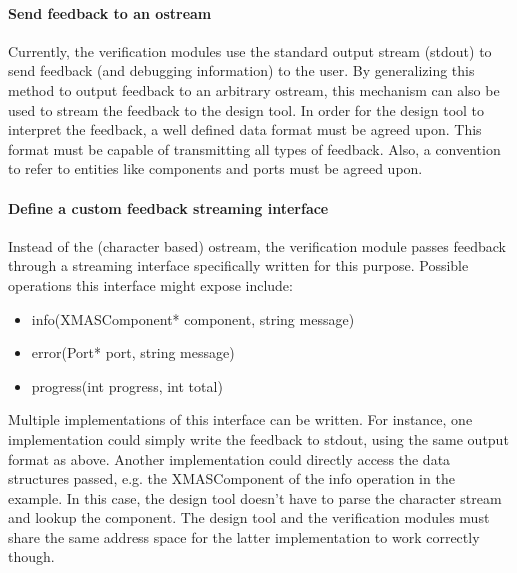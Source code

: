 \documentclass[a4paper,11pt]{article}
\begin{document}
\paragraph{Send feedback to an ostream}
Currently, the verification modules use the standard output stream (stdout)
to send feedback (and debugging information) to the user. By generalizing this
method to output feedback to an arbitrary ostream, this mechanism can also be
used to stream the feedback to the design tool. In order for the design
tool to interpret the feedback, a well defined data format must be agreed upon.
This format must be capable of transmitting all types of feedback. Also,
a convention to refer to entities like components and ports must be agreed upon.

 
\paragraph{Define a custom feedback streaming interface}
Instead of the (character based) ostream, the verification module passes feedback
through a streaming interface specifically written for this purpose. Possible
operations this interface might expose include:
\begin{itemize}
 \item info(XMASComponent* component, string message)
 \item error(Port* port, string message)
 \item progress(int progress, int total)
\end{itemize}
Multiple implementations of this interface can be written. For instance, one
implementation could simply write the feedback to stdout, using the same output
format as above. Another implementation could directly access the data structures
passed, e.g. the XMASComponent of the info operation in the example. In this case,
the design tool doesn't have to parse the character stream and lookup the component.
The design tool and the verification modules must share the same address space for
the latter implementation to work correctly though.
\end{document}
